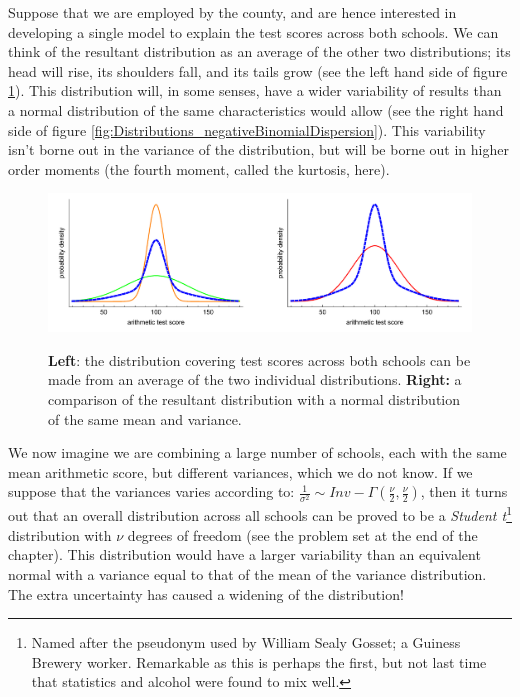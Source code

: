 \documentclass[11pt,fullpage]{book}
\begin{document}
Suppose that we are employed by the county, and are hence interested in developing a single model to explain the test scores across both schools. We can think of the resultant distribution as an average of the other two distributions; its head will rise, its shoulders fall, and its tails grow (see the left hand side of figure \ref{fig:Distributions_tArithmeticDispersion}). This distribution will, in some senses, have a wider variability of results than a normal distribution of the same characteristics would allow (see the right hand side of figure \ref{fig:Distributions_negativeBinomialDispersion}). This variability isn't borne out in the variance of the distribution, but will be borne out in higher order moments (the fourth moment, called the kurtosis, here). 

\begin{figure}
\centering
\scalebox{0.5} 
{\includegraphics{Distributions_tArithmeticDispersion.pdf}}
\caption{\textbf{Left}: the distribution covering test scores across both schools can be made from an average of the two individual distributions. \textbf{Right:} a comparison of the resultant distribution with a normal distribution of the same mean and variance.}\label{fig:Distributions_tArithmeticDispersion}
\end{figure}

We now imagine we are combining a large number of schools, each with the same mean arithmetic score, but different variances, which we do not know. If we suppose that the variances varies according to: $\frac{1}{\sigma^2}\sim Inv-\Gamma(\frac{\nu}{2},\frac{\nu}{2})$, then it turns out that an overall distribution across all schools can be proved to be a \textit{Student t}\footnote{Named after the pseudonym used by William Sealy Gosset; a Guiness Brewery worker. Remarkable as this is perhaps the first, but not last time that statistics and alcohol were found to mix well.} distribution with $\nu$ degrees of freedom (see the problem set at the end of the chapter). This distribution would have a larger variability than an equivalent normal with a variance equal to that of the mean of the variance distribution. The extra uncertainty has caused a widening of the distribution!
\end{document}
